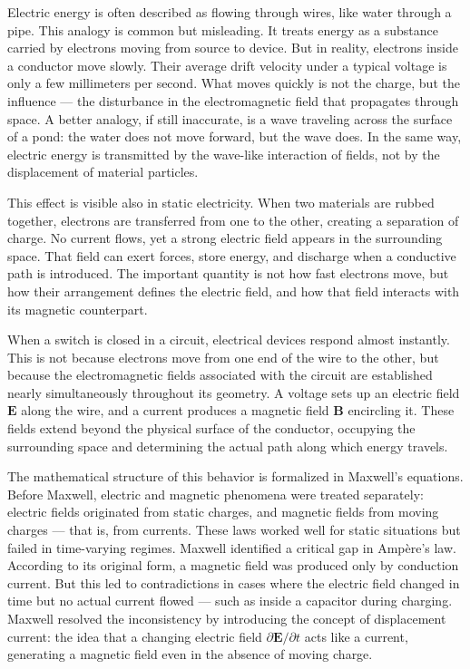 Electric energy is often described as flowing through wires, like water through a pipe. This analogy is common but misleading. It treats energy as a substance carried by electrons moving from source to device. But in reality, electrons inside a conductor move slowly. Their average drift velocity under a typical voltage is only a few millimeters per second. What moves quickly is not the charge, but the influence — the disturbance in the electromagnetic field that propagates through space. A better analogy, if still inaccurate, is a wave traveling across the surface of a pond: the water does not move forward, but the wave does. In the same way, electric energy is transmitted by the wave-like interaction of fields, not by the displacement of material particles.

This effect is visible also in static electricity. When two materials are rubbed together, electrons are transferred from one to the other, creating a separation of charge. No current flows, yet a strong electric field appears in the surrounding space. That field can exert forces, store energy, and discharge when a conductive path is introduced. The important quantity is not how fast electrons move, but how their arrangement defines the electric field, and how that field interacts with its magnetic counterpart.

When a switch is closed in a circuit, electrical devices respond almost instantly. This is not because electrons move from one end of the wire to the other, but because the electromagnetic fields associated with the circuit are established nearly simultaneously throughout its geometry. A voltage sets up an electric field $\mathbf{E}$ along the wire, and a current produces a magnetic field $\mathbf{B}$ encircling it. These fields extend beyond the physical surface of the conductor, occupying the surrounding space and determining the actual path along which energy travels.

The mathematical structure of this behavior is formalized in Maxwell’s equations. Before Maxwell, electric and magnetic phenomena were treated separately: electric fields originated from static charges, and magnetic fields from moving charges — that is, from currents. These laws worked well for static situations but failed in time-varying regimes. Maxwell identified a critical gap in Ampère’s law. According to its original form, a magnetic field was produced only by conduction current. But this led to contradictions in cases where the electric field changed in time but no actual current flowed — such as inside a capacitor during charging. Maxwell resolved the inconsistency by introducing the concept of displacement current: the idea that a changing electric field $\partial \mathbf{E}/\partial t$ acts like a current, generating a magnetic field even in the absence of moving charge.

